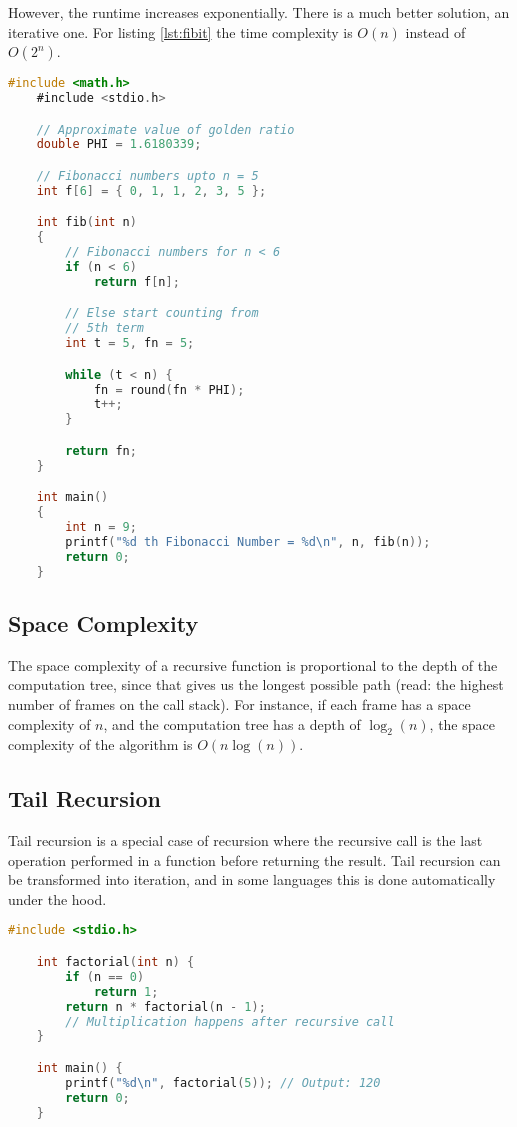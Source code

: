 However, the runtime increases exponentially.
There is a much better solution, an iterative one.
For listing \ref{lst:fibit} the time complexity is $O(n)$
instead of $O(2^n)$.

\begin{lstlisting}[language=C, label={lst:fibit}, caption=Singly Linked List Node Structure]
    #include <math.h>
    #include <stdio.h>

    // Approximate value of golden ratio
    double PHI = 1.6180339;

    // Fibonacci numbers upto n = 5
    int f[6] = { 0, 1, 1, 2, 3, 5 };

    int fib(int n)
    {
        // Fibonacci numbers for n < 6
        if (n < 6)
            return f[n];

        // Else start counting from
        // 5th term
        int t = 5, fn = 5;

        while (t < n) {
            fn = round(fn * PHI);
            t++;
        }

        return fn;
    }

    int main()
    {
        int n = 9;
        printf("%d th Fibonacci Number = %d\n", n, fib(n));
        return 0;
    }
\end{lstlisting}

\subsection{Space Complexity}

The space complexity of a recursive function is proportional to
the depth of the computation tree, since that gives us the longest
possible path (read: the highest number of frames on the call stack).
For instance, if each frame has a space complexity of $n$, and the
computation tree has a depth of $\log_2(n)$, the space complexity
of the algorithm is $O(n\log(n))$.

\subsection{Tail Recursion}
Tail recursion is a special case of recursion where the recursive
call is the last operation performed in a function before returning
the result. Tail recursion can be transformed into iteration, and in
some languages this is done automatically under the hood.

\begin{lstlisting}[language=C, caption={Regular Recursion}]
    #include <stdio.h>

    int factorial(int n) {
        if (n == 0)
            return 1;
        return n * factorial(n - 1);  
        // Multiplication happens after recursive call
    }

    int main() {
        printf("%d\n", factorial(5)); // Output: 120
        return 0;
    }
\end{lstlisting}

